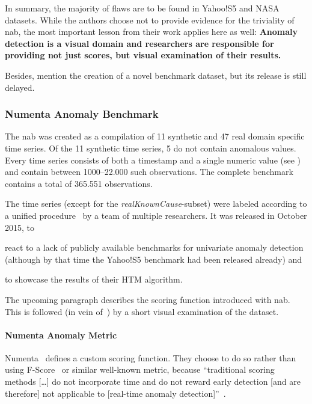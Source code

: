 In summary, the majority of flaws are to be found in Yahoo!S5 and NASA datasets.
While the authors choose not to provide evidence for the triviality of \gls{nab},
the most important lesson from their work applies here as well:
\textbf{Anomaly detection is a visual domain and researchers are responsible for
providing not just scores, but visual examination of their results.}

Besides, \textcite{Renjie.2020} mention the creation of a novel benchmark dataset,
but its release is still delayed. 



\subsubsection{Numenta Anomaly Benchmark}
The \acrfull{nab} was created as a compilation of 11 synthetic and 47 real
domain specific time series. Of the 11 synthetic time series, 5 do not contain
anomalous values. Every time series consists of both a timestamp and a single
numeric value (see ) and contain between 1000--22.000 such
observations. The complete benchmark contains a total of 365.551 observations.

The time series (except for the \textit{realKnownCause}-subset) were labeled
according to a unified procedure~\cite{Numenta.2015} by a team of
multiple researchers. It was released in October 2015, to
\begin{enumerate*}[a.)]
    \item react to a lack of publicly available benchmarks
    for univariate anomaly detection (although by that time the Yahoo!S5 benchmark
    had been released already) and 
    \item to showcase the results of their HTM algorithm.
\end{enumerate*}
The upcoming paragraph describes the scoring function introduced with \gls{nab}.
This is followed (in vein of~\cite{Renjie.2020}) by a short visual examination
of the dataset.

\paragraph{Numenta Anomaly Metric}
Numenta~\cite{Lavin.2015} defines a custom scoring function.
They choose to do so rather than using F-Score~\cite[183]{Murphy.2012} or similar
well-known metric, because ``traditional scoring methods [\dots] do not incorporate
time and do not reward early detection [and are therefore] not applicable to
[real-time anomaly detection]''~\cite{Lavin.2015}.

